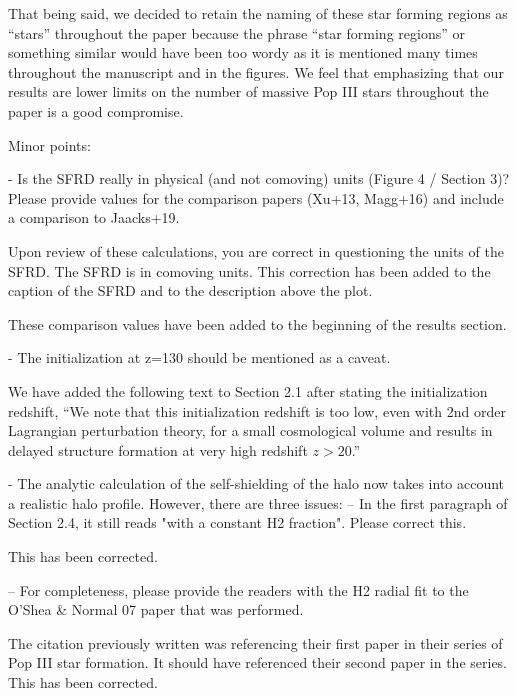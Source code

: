 \documentclass[11pt]{article}
\newenvironment{referee}[1][]{%
    \ignorespaces%
    \begin{mdframed}[style=myquotestyle,#1]%
}{%
    \end{mdframed}%
    \ignorespacesafterend%
}%
\begin{document}
    That being said, we decided to retain the naming of these star forming regions as ``stars'' throughout the paper because the phrase ``star forming regions'' or something similar would have been too wordy as it is mentioned many times throughout the manuscript and in the figures.  We feel that emphasizing that our results are lower limits on the number of massive Pop III stars throughout the paper is a good compromise.

\begin{referee}
    Minor points: 

    - Is the SFRD really in physical (and not comoving) units (Figure 4 / Section 3)? Please provide values for the comparison papers (Xu+13, Magg+16) and include a comparison to Jaacks+19. 
\end{referee}
    Upon review of these calculations, you are correct in questioning the units of the SFRD. The SFRD is in comoving units. This correction has been added to the caption of the SFRD and to the description above the plot. 

    These comparison values have been added to the beginning of the results section.

\begin{referee}
    - The initialization at z=130 should be mentioned as a caveat. 
\end{referee}
	We have added the following text to Section 2.1 after stating the initialization redshift, ``We note that this initialization redshift is too low, even with 2nd order Lagrangian perturbation theory, for a small cosmological volume and results in delayed structure formation at very high redshift $z > 20$.''    


\begin{referee}
    - The analytic calculation of the self-shielding of the halo now takes into account a realistic halo profile. However, there are three issues: 
    -- In the first paragraph of Section 2.4, it still reads "with a constant H2 fraction". Please correct this. 
\end{referee}
    This has been corrected.

\begin{referee}
    -- For completeness, please provide the readers with the H2 radial fit to the O'Shea \& Normal 07 paper that was performed. 
\end{referee}
    The citation previously written was referencing their first paper in their series of Pop III star formation. It should have referenced their second paper in the series. This has been corrected.
    
\end{document}
